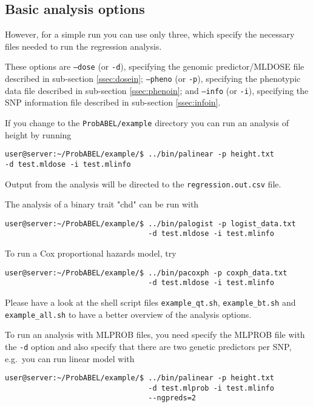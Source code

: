 \documentclass[12pt,a4paper]{article}
\begin{document}
\subsection{Basic analysis options}
However, for a simple run you can use only three, which specify the necessary files 
needed to run the regression analysis.

These options are 
\texttt{--dose} (or \texttt{-d}), 
specifying the genomic predictor/MLDOSE file described in sub-section \ref{ssec:dosein};
\texttt{--pheno} (or \texttt{-p}), 
specifying the phenotypic data file described in sub-section \ref{ssec:phenoin}; and
\texttt{--info} (or \texttt{-i}), 
specifying the SNP information file described in sub-section \ref{ssec:infoin}.

If you change to the \texttt{ProbABEL/example} directory you can run
an analysis of height by running
\begin{verbatim}
user@server:~/ProbABEL/example/$ ../bin/palinear -p height.txt 
-d test.mldose -i test.mlinfo
\end{verbatim}
Output from the analysis will be directed to the \texttt{regression.out.csv} file.

The analysis of a binary trait "chd" can be run with 
\begin{verbatim}
user@server:~/ProbABEL/example/$ ../bin/palogist -p logist_data.txt 
                                 -d test.mldose -i test.mlinfo
\end{verbatim}

To run a Cox proportional hazards model, try 
\begin{verbatim}
user@server:~/ProbABEL/example/$ ../bin/pacoxph -p coxph_data.txt 
                                 -d test.mldose -i test.mlinfo
\end{verbatim}

Please have a look at the shell script files \texttt{example\_qt.sh}, 
\texttt{example\_bt.sh} and \texttt{example\_all.sh} to have
a better overview of the analysis options.

To run an analysis with MLPROB files, you need specify the MLPROB file 
with the \texttt{-d} option and also specify that there are two genetic predictors 
per SNP, e.g.~you can run linear model with
\begin{verbatim}
user@server:~/ProbABEL/example/$ ../bin/palinear -p height.txt 
                                 -d test.mlprob -i test.mlinfo 
                                 --ngpreds=2
\end{verbatim}
\end{document}
